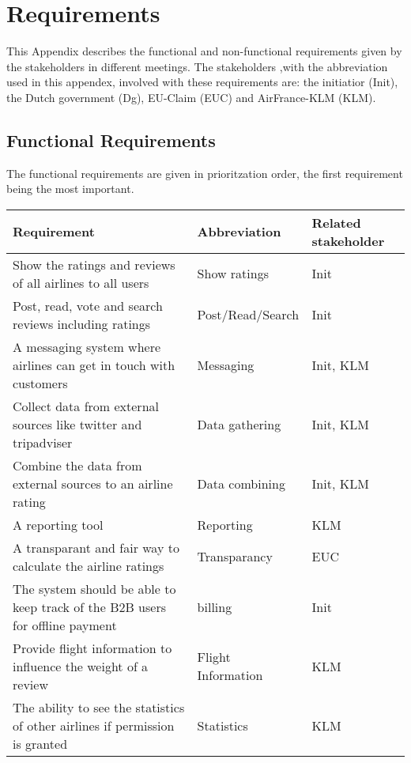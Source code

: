 \section{Requirements}
This Appendix describes the functional and non-functional requirements given by the stakeholders in different meetings. The stakeholders ,with the abbreviation used in this appendex, involved with these requirements are: the initiatior (Init), the Dutch government (Dg), EU-Claim (EUC) and AirFrance-KLM (KLM). 

\subsection*{Functional Requirements}
The functional requirements are given in prioritzation order, the first requirement being the most important. 

\begin{longtable}{| p{10cm}| l | l |}
\hline
\textbf{Requirement} & \textbf{Abbreviation} & \textbf{Related stakeholder} \\ \hline
Show the ratings and reviews of all airlines to all users & Show ratings & Init \\ \hline
Post, read, vote and search reviews including ratings & Post/Read/Search & Init \\ \hline
A messaging system where airlines can get in touch with customers & Messaging & Init, KLM\\ \hline
Collect data from external sources like twitter and tripadviser & Data gathering &Init, KLM \\ \hline
Combine the data from external sources to an airline rating & Data combining &Init, KLM \\ \hline
A reporting tool & Reporting & KLM \\ \hline
A transparant and fair way to calculate the airline ratings & Transparancy & EUC \\ \hline
The system should be able to keep track of the B2B users for offline payment & billing & Init \\ \hline
Provide flight information to influence the weight of a review & Flight Information & KLM  \\ \hline
The ability to see the statistics of other airlines if permission is granted & Statistics & KLM \\ \hline 

\end{longtable}

